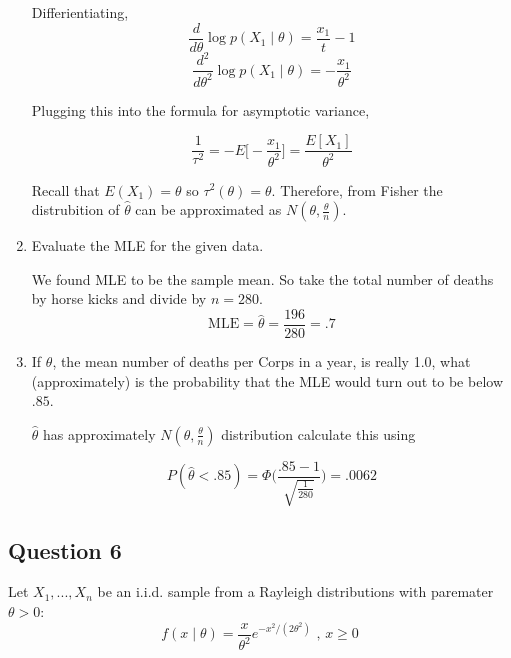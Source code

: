 \documentclass{tufte-book}
\newcommand{\MLE}{\mathrm{MLE}}
\theoremstyle{mytheoremstyle}
\theoremstyle{mylemstyle}
\theoremstyle{mydefstyle}
\begin{document}
\begin{enumerate}
Differientiating,
\[ \frac{d}{d\theta}\log p(X_1 \mid \theta) = \frac{x_1}{t}-1 \]
\[ \frac{d^2}{d\theta^2}\log p(X_1 \mid \theta) = -\frac{x_1}{\theta^2} \]

Plugging this into the formula for asymptotic variance,

\[ \frac{1}{\tau^2} = -E\Big[-\frac{x_1}{\theta^2}\Big] = \frac{E[X_1]}{\theta^2} \]

Recall that $E(X_1) = \theta$ so $\tau^2(\theta) = \theta$.  Therefore, from Fisher the distrubition of $\hat{\theta}$ can be approximated as $N(\theta, \frac{\theta}{n})$.

\item Evaluate the MLE for the given data.

We found MLE to be the sample mean.  So take the total number of deaths by horse kicks and divide by $n=280$.
\[ \MLE = \hat{\theta} = \frac{196}{280}= .7 \]

\item If $\theta$, the mean number of deaths per Corps in a year, is really 1.0, what (approximately) is the probability that the MLE would turn out to be below $.85$.

 $\hat{\theta}$ has approximately $N(\theta, \frac{\theta}{n})$ distribution calculate this using

\[P(\hat{\theta} < .85) = \Phi\Big(\frac{.85-1}{\sqrt{\frac{1}{280}}}\Big) = .0062\]
\end{enumerate}

\subsection{Question 6}
Let $X_1,...,X_n$ be an i.i.d. sample from a Rayleigh distributions with paremater $\theta>0$:
\[ f(x\mid \theta) = \frac{x}{\theta^2}e^{-x^2/(2\theta^2)} \text{ , } x \geq 0 \]
\end{document}
